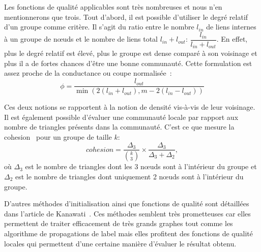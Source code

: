 Les fonctions de qualité applicables sont très nombreuses et nous n'en mentionnerons que trois.
Tout d'abord, il est possible d'utiliser le degré relatif~\cite{Luo2008} d'un groupe comme critère.
Il s'agit du ratio entre le nombre $l_{in}$ de liens internes à un groupe de n\oe uds et le nombre de liens total $l_{in}+l_{out}$: $ \dfrac{l_{in}}{l_{in}+l_{out}}$.
En effet, plus le degré relatif est élevé, plus le groupe est dense comparé à son voisinage et plus il a de fortes chances d'être une bonne communauté. 
Cette formulation est assez proche de la conductance ou coupe normalisée~\cite{Shi2000}:
\begin{equation}
\phi =\dfrac{l_{out}}{\min \left( 2(l_{in}+l_{out}),m-2(l_{in}-l_{out}) \right) }
\end{equation}

Ces deux notions se rapportent à la notion de densité vis-à-vis de leur voisinage.
Il est également possible d'évaluer une communauté locale par rapport aux nombre de triangles présents dans la communauté.
C'est ce que mesure la cohesion~\cite{Friggeri2011} pour un groupe de taille $k$: 
\begin{equation}
cohesion=\dfrac{\Delta_3}{ {k \choose 3} } \times \frac{\Delta_3}{\Delta_3+\Delta_2},
\end{equation}
où $\Delta_3$ est le nombre de triangles dont les 3 n\oe uds sont à l'intérieur du groupe et $\Delta_2$ est le nombre de triangles dont uniquement 2 n\oe uds sont à l'intérieur du groupe.

D'autres méthodes d'initialisation ainsi que fonctions de qualité sont détaillées dans l'article de Kanawati~\cite{Kanawati2014}.
Ces méthodes semblent très prometteuses car elles permettent de traiter efficacement de très grands graphes tout comme les algorithme de propagations de label mais elles profitent des fonctions de qualité locales qui permettent d'une certaine manière d'évaluer le résultat obtenu.





